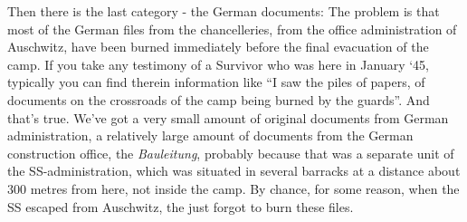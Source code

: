 Then there is the last category - the German documents: The problem is that most of the German files from the chancelleries, from the office administration of Auschwitz, have been burned immediately before the final evacuation of the camp. If you take any testimony of a Survivor who was here in January ‘45, typically you can find therein information like ``I saw the piles of papers, of documents on the crossroads of the camp being burned by the guards''. And that's true. We've got a very small amount of original documents from German administration, a relatively large amount of documents from the German construction office, the \textit{Bauleitung}, probably because that was a separate unit of the SS-administration, which was situated in several barracks at a distance about 300 metres from here, not inside the camp. By chance, for some reason, when the SS escaped from Auschwitz, the just forgot to burn these files. \\

